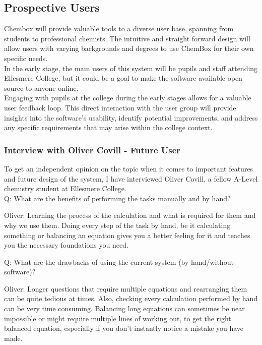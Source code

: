 \documentclass[a4paper,12pt]{article}
\begin{document}
\newpage

\subsection{Prospective Users}

Chembox will provide valuable tools to a diverse user base, spanning from students to professional chemists. The intuitive and straight forward design will allow users with varying backgrounds and degrees to use ChemBox for their own specific needs.\\
In the early stage, the main users of this system will be pupils and staff attending Ellesmere College, but it could be a goal to make the software available open source to anyone online.\\
Engaging with pupils at the college during the early stages allows for a valuable user feedback loop. This direct interaction with the user group will provide insights into the software's usability, identify potential improvements, and address any specific requirements that may arise within the college context.

\subsubsection{Interview with Oliver Covill - Future User}

To get an independent opinion on the topic when it comes to important features and future design of the system, I have interviewed Oliver Covill, a fellow A-Level chemistry student at Ellesmere College.\\

Q: What are the benefits of performing the tasks manually and by hand?
\linebreak

Oliver: Learning the process of the calculation and what is required for them and why we use them. Doing every step of the task by hand, be it calculating something or balancing an equation gives you a better feeling for it and teaches you the necessary foundations you need.\\
\linebreak

Q: What are the drawbacks of using the current system (by hand/without software)?
\linebreak

Oliver: Longer questions that require multiple equations and rearranging them can be quite tedious at times. Also, checking every calculation performed by hand can be very time consuming. Balancing long equations can sometimes be near impossible or might require multiple lines of working out, to get the right balanced equation, especially if you don't instantly notice a mistake you have made.\\
\end{document}
